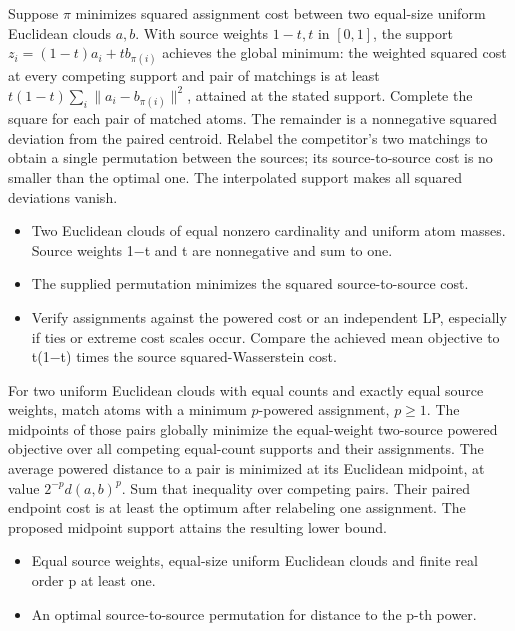 \expandafter\def\csname statadic@statement@STATADIC-BARYCENTRE-005\endcsname{Suppose $\pi$ minimizes squared assignment cost between two equal-size
  uniform Euclidean clouds $a,b$. With source weights $1-t,t$ in $[0,1]$, the support
  $z_i=(1-t)a_i+t b_{\pi(i)}$ achieves the global minimum: the weighted squared cost
  at every competing support and pair of matchings is at least
  $t(1-t)\sum_i\|a_i-b_{\pi(i)}\|^2$, attained at the stated support.}
\expandafter\def\csname statadic@proof@STATADIC-BARYCENTRE-005\endcsname{Complete the square for each pair of matched atoms. The remainder
  is a nonnegative squared deviation from the paired centroid. Relabel the
  competitor's two matchings to obtain a single permutation between the sources;
  its source-to-source cost is no smaller than the optimal one. The interpolated
  support makes all squared deviations vanish.}
\expandafter\def\csname statadic@assumptions@STATADIC-BARYCENTRE-005\endcsname{\begin{itemize}
\item Two Euclidean clouds of equal nonzero cardinality and uniform atom masses. Source weights 1\ensuremath{-}t and t are nonnegative and sum to one.
\item The supplied permutation minimizes the squared source-to-source cost.
\end{itemize}}
\expandafter\def\csname statadic@diagnostics@STATADIC-BARYCENTRE-005\endcsname{\begin{itemize}
\item Verify assignments against the powered cost or an independent LP, especially if ties or extreme cost scales occur. Compare the achieved mean objective to t(1\ensuremath{-}t) times the source squared-Wasserstein cost.
\end{itemize}}
\expandafter\def\csname statadic@statement@STATADIC-BARYCENTRE-006\endcsname{For two uniform Euclidean clouds with equal counts and exactly equal
  source weights, match atoms with a minimum $p$-powered assignment, $p\ge1$. The midpoints
  of those pairs globally minimize the equal-weight two-source powered objective over
  all competing equal-count supports and their assignments.}
\expandafter\def\csname statadic@proof@STATADIC-BARYCENTRE-006\endcsname{The average powered distance to a pair is minimized at its Euclidean
  midpoint, at value $2^{-p}d(a,b)^p$. Sum that inequality over competing pairs.
  Their paired endpoint cost is at least the optimum after relabeling one assignment.
  The proposed midpoint support attains the resulting lower bound.}
\expandafter\def\csname statadic@assumptions@STATADIC-BARYCENTRE-006\endcsname{\begin{itemize}
\item Equal source weights, equal-size uniform Euclidean clouds and finite real order p at least one.
\item An optimal source-to-source permutation for distance to the p-th power.
\end{itemize}}
